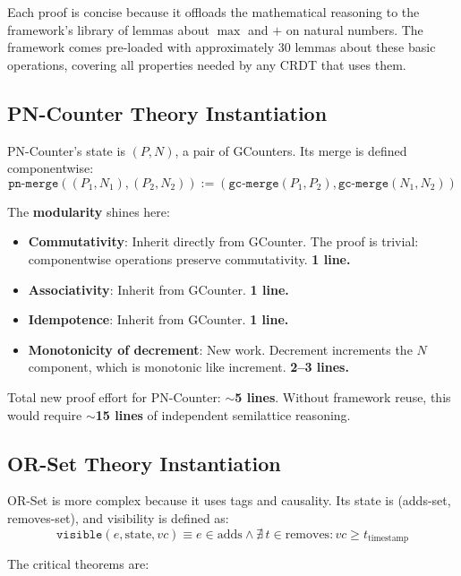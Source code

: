 Each proof is concise because it offloads the mathematical reasoning to the framework's library of lemmas about $\max$ and $+$ on natural numbers. The framework comes pre-loaded with approximately 30 lemmas about these basic operations, covering all properties needed by any CRDT that uses them.

\subsection{PN-Counter Theory Instantiation}

PN-Counter's state is $(P, N)$, a pair of GCounters. Its merge is defined componentwise:
\[
\texttt{pn-merge}((P_1, N_1), (P_2, N_2)) := (\texttt{gc-merge}(P_1, P_2), \texttt{gc-merge}(N_1, N_2))
\]

The \textbf{modularity} shines here:

\begin{itemize}
  \item \textbf{Commutativity}: Inherit directly from GCounter. The proof is trivial: componentwise operations preserve commutativity. \textbf{1 line.}
  \item \textbf{Associativity}: Inherit from GCounter. \textbf{1 line.}
  \item \textbf{Idempotence}: Inherit from GCounter. \textbf{1 line.}
  \item \textbf{Monotonicity of decrement}: New work. Decrement increments the $N$ component, which is monotonic like increment. \textbf{2--3 lines.}
\end{itemize}

Total new proof effort for PN-Counter: \textbf{$\sim$5 lines}. Without framework reuse, this would require \textbf{$\sim$15 lines} of independent semilattice reasoning.

\subsection{OR-Set Theory Instantiation}

OR-Set is more complex because it uses tags and causality. Its state is (adds-set, removes-set), and visibility is defined as:
\[
\texttt{visible}(e, \text{state}, vc) \equiv e \in \text{adds} \land \nexists \, t \in \text{removes} : vc \geq t_{\text{timestamp}}
\]

The critical theorems are:

